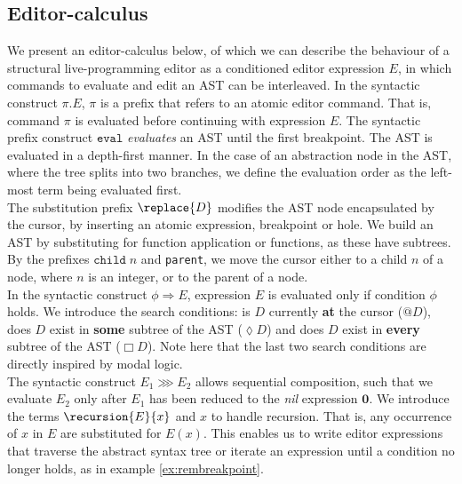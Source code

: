 \subsection*{Editor-calculus}\label{EDITCALCULUS}
We present an editor-calculus below, of which we can describe the behaviour of a structural live-programming editor as a conditioned editor expression $E$, in which commands to evaluate and edit an AST can be interleaved. In the syntactic construct $\pi.E$, $\pi$ is a prefix that refers to an atomic editor command. That is, command $\pi$ is evaluated before continuing with expression $E$. The syntactic prefix construct $\texttt{eval}$ \textit{evaluates} an AST until the first breakpoint. The AST is evaluated in a depth-first manner. In the case of an abstraction node in the AST, where the tree splits into two branches, we define the evaluation order as the left-most term being evaluated first. \\

The substitution prefix $\replace{D}$ modifies the AST node encapsulated by the cursor, by inserting an atomic expression, breakpoint or hole. We build an AST by substituting for function application or functions, as these have subtrees. By the prefixes $\texttt{child}\; n$ and \texttt{parent}, we move the cursor either to a child $n$ of a node, where $n$ is an integer, or to the parent of a node.\\ 

In the syntactic construct $\phi \Rightarrow E$, expression $E$ is evaluated only if condition $\phi$ holds. We introduce the search conditions: is $D$ currently \textbf{at} the cursor ($@ D$), does $D$ exist in \textbf{some} subtree of the AST ($\lozenge D$) and does $D$ exist in \textbf{ every} subtree of the AST ($\Box  D$). Note here that the last two search conditions are directly inspired by modal logic.\\

The syntactic construct $E_1 \ggg E_2$ allows sequential composition, such that we evaluate $E_2$ only after $E_1$ has been reduced to the \textit{nil} expression $\mathbf{0}$. We introduce the terms $\recursion{E}{x}$ and $x$ to handle recursion. That is, any occurrence of $x$ in $E$ are substituted for $E(x)$. This enables us to write editor expressions that traverse the abstract syntax tree or iterate an expression until a condition no longer holds, as in example \ref{ex:rembreakpoint}.


